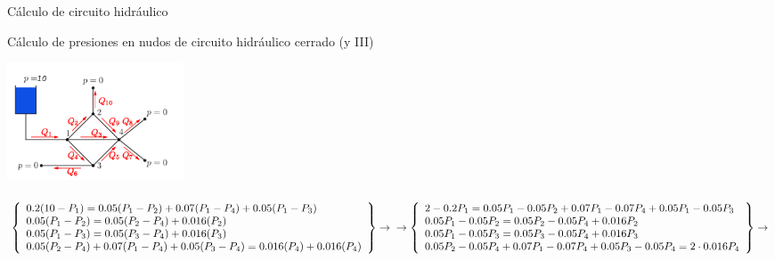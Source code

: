 \documentclass [8pt] {beamer}
\begin{document}
        \begin{frame}{Cálculo de circuito hidráulico}
            \begin{exampleblock}{Cálculo de presiones en nudos de circuito hidráulico cerrado (y III)}
                \begin{center}
                    {\includegraphics[height=3.5cm]{hidraulic.png}} \\ \ \\
                    {$\left\{ \begin{array}{l}
                    0.2 ( 10 - P_1) = 0.05 ( P_1 - P_2) + 0.07 ( P_1 - P_4) + 0.05 ( P_1 - P_3)\\
                    0.05 ( P_1 - P_2) = 0.05 ( P_2 - P_4) + 0.016 ( P_2)\\
                    0.05 ( P_1 - P_3) = 0.05 ( P_3 - P_4) + 0.016 ( P_3)\\
                    0.05 ( P_2 - P_4) + 0.07 ( P_1 - P_4) + 0.05 ( P_3 - P_4) = 0.016 ( P_4) + 0.016 ( P_4)
                    \end{array} \right\} \rightarrow \\ \ \\ \ \\  \rightarrow \left\{ \begin{array}{l}
                    2 - 0.2 P_1 = 0.05 P_1 - 0.05 P_2 + 0.07 P_1 - 0.07 P_4 + 0.05 P_1 - 0.05 P_3\\
                    0.05 P_1 - 0.05 P_2 = 0.05 P_2 - 0.05 P_4 + 0.016 P_2\\
                    0.05 P_1 - 0.05 P_3 = 0.05 P_3 - 0.05 P_4 + 0.016 P_3\\
                    0.05 P_2 - 0.05 P_4 + 0.07 P_1 - 0.07 P_4 + 0.05 P_3 - 0.05 P_4 = 2 \cdot 0.016 P_4
                    \end{array} \right\} \rightarrow$}
                \end{center}
            \end{exampleblock}
        \end{frame}
\end{document}
